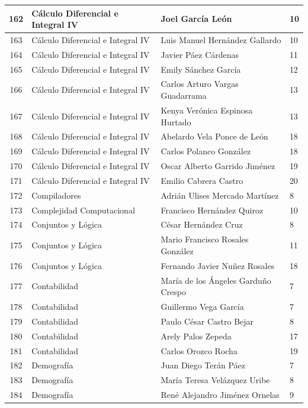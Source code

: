 {\begin{longtable}{|c|p{6.5cm}|p{5cm}|p{1.5cm}|}
  162 & Cálculo Diferencial e Integral IV & Joel García León & 10 \\ \hline 
  163 & Cálculo Diferencial e Integral IV & Luis Manuel Hernández Gallardo & 10 \\ \hline 
  164 & Cálculo Diferencial e Integral IV & Javier Páez Cárdenas & 11 \\ \hline 
  165 & Cálculo Diferencial e Integral IV & Emily Sánchez García & 12 \\ \hline 
  166 & Cálculo Diferencial e Integral IV & Carlos Arturo Vargas Guadarrama & 13 \\ \hline 
  167 & Cálculo Diferencial e Integral IV & Kenya Verónica Espinosa Hurtado & 13 \\ \hline 
  168 & Cálculo Diferencial e Integral IV & Abelardo Vela Ponce de León & 18 \\ \hline 
  169 & Cálculo Diferencial e Integral IV & Carlos Polanco González & 18 \\ \hline 
  170 & Cálculo Diferencial e Integral IV & Oscar Alberto Garrido Jiménez & 19 \\ \hline 
  171 & Cálculo Diferencial e Integral IV & Emilio Cabrera Castro & 20 \\ \hline 
  172 & Compiladores & Adrián Ulises Mercado Martínez & 8 \\ \hline 
  173 & Complejidad Computacional & Francisco Hernández Quiroz & 10 \\ \hline 
  174 & Conjuntos y Lógica & César Hernández Cruz & 8 \\ \hline 
  175 & Conjuntos y Lógica & Mario Francisco Rosales González & 11 \\ \hline 
  176 & Conjuntos y Lógica & Fernando Javier Nuñez Rosales & 18 \\ \hline 
  177 & Contabilidad & María de los Ángeles Garduño Crespo & 7 \\ \hline 
  178 & Contabilidad & Guillermo Vega García & 7 \\ \hline 
  179 & Contabilidad & Paulo César Castro Bejar & 8 \\ \hline 
  180 & Contabilidad & Arely Palos Zepeda & 17 \\ \hline 
  181 & Contabilidad & Carlos Orozco Rocha & 19 \\ \hline 
  182 & Demografía & Juan Diego Terán Páez & 7 \\ \hline 
  183 & Demografía & María Teresa Velázquez Uribe & 8 \\ \hline 
  184 & Demografía & René Alejandro Jiménez Ornelas & 9 \\ \hline 

\end{longtable}}
